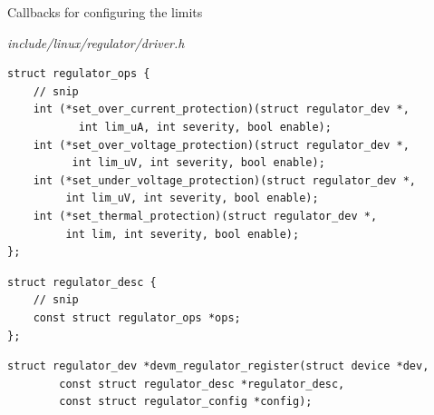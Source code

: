\documentclass[10pt]{beamer}
\begin{document}

\newcommand{\mycfile}[1]{\textit{\small #1}}

\begin{frame}[fragile]{Callbacks for configuring the limits}


\mycfile{include/linux/regulator/driver.h}
\lstset{language=C}
\scriptsize
\begin{lstlisting}
struct regulator_ops {
	// snip
	int (*set_over_current_protection)(struct regulator_dev *,
	       int lim_uA, int severity, bool enable);
	int (*set_over_voltage_protection)(struct regulator_dev *,
	      int lim_uV, int severity, bool enable);
	int (*set_under_voltage_protection)(struct regulator_dev *,
	     int lim_uV, int severity, bool enable);
	int (*set_thermal_protection)(struct regulator_dev *,
	     int lim, int severity, bool enable);
};
\end{lstlisting}
\pause

\begin{lstlisting}
struct regulator_desc {
	// snip
	const struct regulator_ops *ops;
};
 \end{lstlisting}
\pause

\begin{lstlisting}
struct regulator_dev *devm_regulator_register(struct device *dev,
		const struct regulator_desc *regulator_desc,
		const struct regulator_config *config);
\end{lstlisting}
\end{frame}

\end{document}
